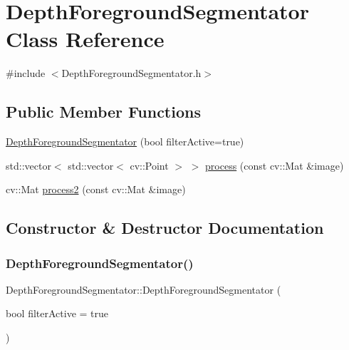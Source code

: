 \hypertarget{class_depth_foreground_segmentator}{}\section{Depth\+Foreground\+Segmentator Class Reference}
\label{class_depth_foreground_segmentator}


{\ttfamily \#include $<$Depth\+Foreground\+Segmentator.\+h$>$}

\subsection*{Public Member Functions}
\begin{DoxyCompactItemize}
\item 
\hyperlink{class_depth_foreground_segmentator_a0c7c752d0bdac12a3fe9bfdda5858f13}{Depth\+Foreground\+Segmentator} (bool filter\+Active=true)
\item 
std\+::vector$<$ std\+::vector$<$ cv\+::\+Point $>$ $>$ \hyperlink{class_depth_foreground_segmentator_a7ad8701ffcce41cf71694f02bbb5f40d}{process} (const cv\+::\+Mat \&image)
\item 
cv\+::\+Mat \hyperlink{class_depth_foreground_segmentator_ade5b418f591506a2e10bd05151d828c2}{process2} (const cv\+::\+Mat \&image)
\end{DoxyCompactItemize}


\subsection{Constructor \& Destructor Documentation}
\mbox{\label{class_depth_foreground_segmentator_a0c7c752d0bdac12a3fe9bfdda5858f13}} 
\subsubsection{\texorpdfstring{Depth\+Foreground\+Segmentator()}{DepthForegroundSegmentator()}}
{\footnotesize\ttfamily Depth\+Foreground\+Segmentator\+::\+Depth\+Foreground\+Segmentator (\begin{DoxyParamCaption}\item[{bool}]{filter\+Active = {\ttfamily true} }\end{DoxyParamCaption})}



